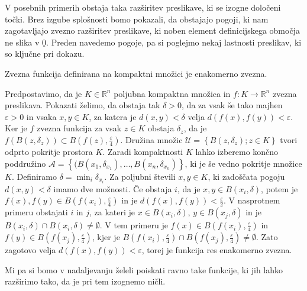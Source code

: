 \documentclass[mat1]{fmfdelo}
\newcommand{\R}{\mathbb R}
\newcommand{\0}{\underline{0}}
\newcommand{\pA}{\mathcal A}
\newcommand{\pU}{\mathcal U}
\begin{document}
V posebnih primerih obstaja taka razširitev preslikave, ki se izogne določeni točki. Brez izgube splošnosti bomo pokazali, da obstajajo pogoji, ki nam zagotavljajo zvezno razširitev preslikave, ki noben element definicijskega območja ne slika v $\0$. Preden navedemo pogoje, pa si poglejmo nekaj lastnosti preslikav, ki so ključne pri dokazu.

\begin{trditev}\label{trd:zvjeenakzv}
Zvezna funkcija definirana na kompaktni množici je enakomerno zvezna.
\end{trditev}
\begin{dokaz}
Predpostavimo, da je $K \in \R^n$ poljubna kompaktna množica in $f : K \to \R^n$ zvezna preslikava. Pokazati želimo, da obstaja tak $\delta > 0$, da za vsak še tako majhen $\varepsilon > 0$ in vsaka $x, y \in K$, za katera je $d(x, y) < \delta$ velja $d(f(x), f(y)) < \varepsilon$. Ker je $f$ zvezna funkcija za vsak $z \in K$ obstaja $\delta_z$, da je $f(B(z, \delta_z)) \subset B(f(z), \frac{\varepsilon}{4})$. Družina množic $\pU = \left \{ B(z, \delta_z); z \in K \right \}$ tvori odprto pokritje prostora $K$. Zaradi kompaktnosti $K$ lahko izberemo končno poddružino $\pA =  \left \{ (B(x_1, \delta_{x_1}), \dots, B(x_n, \delta_{x_n}) \right \}$, ki je še vedno pokritje množice $K$. Definiramo $\delta = \min_i \delta_{x_i}$. Za poljubni števili $x, y \in K$, ki zadoščata pogoju $d(x, y) < \delta$ imamo dve možnosti. Če obstaja $i$, da je $x, y \in B(x_i, \delta)$, potem je $f(x), f(y) \in B(f(x_i), \frac{\varepsilon}{4})$ in je $d(f(x), f(y)) < \frac{\varepsilon}{2}$. V nasprotnem primeru obstajati $i$ in $j$, za kateri je $x \in B(x_i, \delta)$, $y \in B(x_j, \delta)$ in je $B(x_i, \delta) \cap B(x_i, \delta) \neq \emptyset$. V tem primeru je $f(x) \in B(f(x_i), \frac{\varepsilon}{4})$ in $f(y) \in B(f(x_j), \frac{\varepsilon}{4})$, kjer je $B(f(x_i), \frac{\varepsilon}{4}) \cap B(f(x_j), \frac{\varepsilon}{4}) \neq \emptyset$. Zato zagotovo velja $d(f(x), f(y)) < \varepsilon$, torej je funkcija res enakomerno zvezna.
\end{dokaz}

Mi pa si bomo v nadaljevanju želeli poiskati ravno take funkcije, ki jih lahko razširimo tako, da je pri tem izognemo ničli. 
\end{document}
